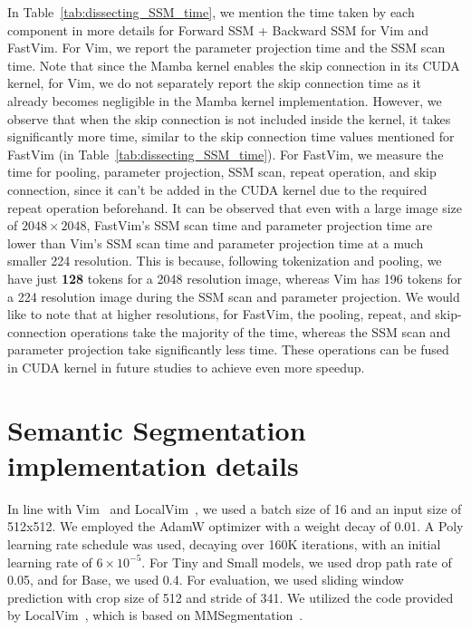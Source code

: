 In Table~\ref{tab:dissecting_SSM_time}, we mention the time taken by each component in more details for Forward SSM + Backward SSM for Vim and FastVim. For Vim, we report the parameter projection time and the SSM scan time. Note that since the Mamba kernel enables the skip connection in its CUDA kernel, for Vim, we do not separately report the skip connection time as it already becomes negligible in the Mamba kernel implementation. However, we observe that when the skip connection is not included inside the kernel, it takes significantly more time, similar to the skip connection time values mentioned for FastVim (in Table~\ref{tab:dissecting_SSM_time}). For FastVim, we measure the time for pooling, parameter projection, SSM scan, repeat operation, and skip connection, since it can't be added in the CUDA kernel due to the required repeat operation beforehand. It can be observed that even with a large image size of \(2048 \times 2048\), FastVim's SSM scan time and parameter projection time are lower than Vim's SSM scan time and parameter projection time at a much smaller 224 resolution. This is because, following tokenization and pooling, we have just \textbf{128} tokens for a 2048 resolution image, whereas Vim has 196 tokens for a 224 resolution image during the SSM scan and parameter projection. We would like to note that at higher resolutions, for FastVim, the pooling, repeat, and skip-connection operations take the majority of the time, whereas the SSM scan and parameter projection take significantly less time. These operations can be fused in CUDA kernel in future studies to achieve even more speedup. 




\section{Semantic Segmentation implementation details}
\label{additional_semantic_implementation_section}

In line with Vim~\cite{vim} and LocalVim~\cite{huang2024localmamba}, we used a batch size of 16 and an input size of 512x512. We employed the AdamW optimizer with a weight decay of 0.01. A Poly learning rate schedule was used, decaying over 160K iterations, with an initial learning rate of \(6 \times 10^{-5}\). For Tiny and Small models, we used drop path rate of 0.05, and for Base, we used 0.4. For evaluation, we used sliding window prediction with crop size of 512 and stride of 341. We utilized the code provided by LocalVim~\cite{huang2024localmamba}, which is based on MMSegmentation~\cite{contributors2020openmmlab}. 


